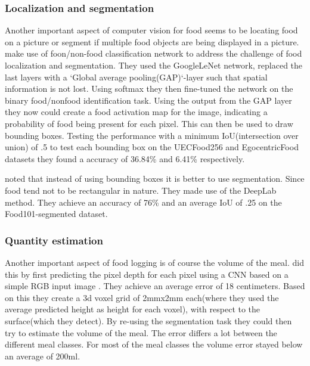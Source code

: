 \documentclass[a4paper]{scrartcl}
\begin{document}
\subsubsection{Localization and segmentation}
Another important aspect of computer vision for food seems to be locating food on a picture or segment if multiple food objects are being displayed in a picture.  make use of foon/non-food classification network to address the challenge of food localization and segmentation. They used the GoogleLeNet network, replaced the last layers with a `Global average pooling(GAP)`-layer such that spatial information is not lost. Using softmax they then fine-tuned the network on the binary food/nonfood identification task. Using the output from the GAP layer they now could create a food activation map for the image, indicating a probability of food being present for each pixel. This can then be used to draw bounding boxes.  Testing the performance with a minimum IoU(intersection over union) of .5 to test each bounding box on the UECFood256 and EgocentricFood datasets they found a accuracy of 36.84\% and 6.41\% respectively.  

 noted that instead of using bounding boxes it is better to use segmentation. Since food tend not to be rectangular in nature. They made use of  the DeepLab\cite{chen2014semantic} method. They achieve an accuracy of 76\% and an average IoU of .25 on the Food101-segmented dataset.   

\subsubsection{Quantity estimation}
Another important aspect of food logging is of course the volume of the meal.  did this by first predicting the pixel depth for each pixel using a CNN based on a simple RGB input image \cite{eigen2015predicting}. They achieve an average error of 18 centimeters. Based on this they create a 3d voxel grid of 2mmx2mm each(where they used the average predicted height as height for each voxel), with respect to the surface(which they detect). By re-using the segmentation task they could then try to estimate the volume of the meal. The error differs a lot between the different meal classes. For most of the meal classes the volume error stayed below an average of 200ml. 
\end{document}
